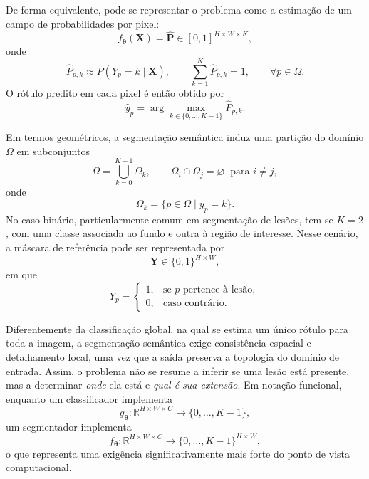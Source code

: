 \documentclass[tcc,capa]{texufpel}
\begin{document}
De forma equivalente, pode-se representar o problema como a estimação de um campo de probabilidades por pixel:
\begin{equation}
	f_{\boldsymbol{\theta}}(\mathbf{X}) = \hat{\mathbf{P}} \in [0,1]^{H \times W \times K},
\end{equation}
onde
\begin{equation}
	\hat{P}_{p,k} \approx P(Y_p = k \mid \mathbf{X}),
	\qquad
	\sum_{k=1}^{K}\hat{P}_{p,k}=1,
	\qquad \forall p \in \Omega.
\end{equation}
O rótulo predito em cada pixel é então obtido por
\begin{equation}
	\hat{y}_p = \arg\max_{k \in \{0,\dots,K-1\}} \hat{P}_{p,k}.
\end{equation}

Em termos geométricos, a segmentação semântica induz uma partição do domínio \(\Omega\) em subconjuntos
\begin{equation}
	\Omega = \bigcup_{k=0}^{K-1} \Omega_k,
	\qquad
	\Omega_i \cap \Omega_j = \varnothing \;\; \text{para } i\neq j,
\end{equation}
onde
\begin{equation}
	\Omega_k = \{ p \in \Omega \mid y_p = k \}.
\end{equation}
No caso binário, particularmente comum em segmentação de lesões, tem-se \(K=2\), com uma classe associada ao fundo e outra à região de interesse. Nesse cenário, a máscara de referência pode ser representada por
\begin{equation}
	\mathbf{Y} \in \{0,1\}^{H \times W},
\end{equation}
em que
\begin{equation}
	Y_p =
	\begin{cases}
		1, & \text{se } p \text{ pertence à lesão},\\
		0, & \text{caso contrário}.
	\end{cases}
\end{equation}

Diferentemente da classificação global, na qual se estima um único rótulo para toda a imagem, a segmentação semântica exige consistência espacial e detalhamento local, uma vez que a saída preserva a topologia do domínio de entrada. Assim, o problema não se resume a inferir se uma lesão está presente, mas a determinar \emph{onde} ela está e \emph{qual é sua extensão}. Em notação funcional, enquanto um classificador implementa
\begin{equation}
	g_{\boldsymbol{\theta}} : \mathbb{R}^{H \times W \times C} \rightarrow \{0,\dots,K-1\},
\end{equation}
um segmentador implementa
\begin{equation}
	f_{\boldsymbol{\theta}} : \mathbb{R}^{H \times W \times C} \rightarrow \{0,\dots,K-1\}^{H \times W},
\end{equation}
o que representa uma exigência significativamente mais forte do ponto de vista computacional.
\end{document}
